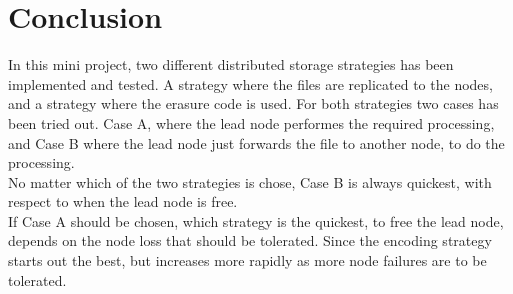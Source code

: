 \section{Conclusion} \label{sec:conc}

In this mini project, two different distributed storage strategies has been implemented and tested. A strategy where the files are replicated to the nodes, and a strategy where the erasure code is used. For both strategies two cases has been tried out. Case A, where the lead node performes the required processing, and Case B where the lead node just forwards the file to another node, to do the processing.\\
No matter which of the two strategies is chose, Case B is always quickest, with respect to when the lead node is free. \\
If Case A should be chosen, which strategy is the quickest, to free the lead node, depends on the node loss that should be tolerated. Since the encoding strategy starts out the best, but increases more rapidly as more node failures are to be tolerated.\\

